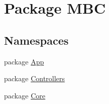 \hypertarget{namespace_m_b_c}{\section{Package M\-B\-C}
\label{namespace_m_b_c}
}
\subsection*{Namespaces}
\begin{DoxyCompactItemize}
\item 
package \hyperlink{namespace_m_b_c_1_1_app}{App}
\item 
package \hyperlink{namespace_m_b_c_1_1_controllers}{Controllers}
\item 
package \hyperlink{namespace_m_b_c_1_1_core}{Core}
\end{DoxyCompactItemize}
